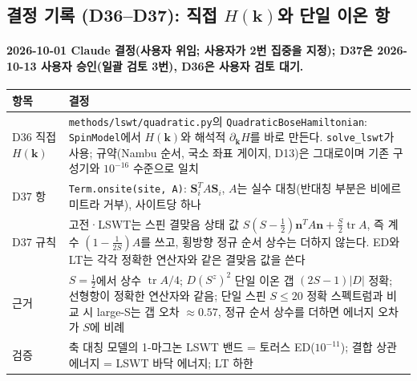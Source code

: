 \subsection{결정 기록 (D36--D37): 직접 $H(\mathbf k)$와 단일 이온 항}\label{decisions-d36-onsite}
\begingroup%
  \framesubtitle{2026-10-01 Claude 결정(사용자 위임; 사용자가 2번 집중을 지정); D37은 2026-10-13 사용자 승인(일괄 검토 3번), D36은 사용자 검토 대기.}
  \small\renewcommand{\arraystretch}{1.12}
  \begin{tabularx}{\textwidth}{@{}P{3.0cm}Y@{}}
    \toprule
    항목 & 결정 \\
    \midrule
    D36 직접 $H(\mathbf k)$ & \texttt{methods/lswt/quadratic.py}의 \texttt{QuadraticBoseHamiltonian}: \texttt{SpinModel}에서 $H(\mathbf k)$와 해석적 $\partial_{\mathbf k}H$를 바로 만든다. \texttt{solve\_lswt}가 사용; 규약(Nambu 순서, 국소 좌표 게이지, D13)은 그대로이며 기존 구성기와 $10^{-16}$ 수준으로 일치 \\
    D37 항 & \texttt{Term.onsite(site, A)}: $\mathbf S_i^{T}A\mathbf S_i$, $A$는 실수 대칭(반대칭 부분은 비에르미트라 거부), 사이트당 하나 \\
    D37 규칙 & 고전·LSWT는 스핀 결맞음 상태 값 $S(S-\tfrac12)\mathbf n^{T}A\mathbf n+\tfrac S2\operatorname{tr}A$, 즉 계수 $(1-\tfrac1{2S})A$를 쓰고, 횡방향 정규 순서 상수는 더하지 않는다. ED와 LT는 각각 정확한 연산자와 같은 결맞음 값을 쓴다 \\
    근거 & $S=\tfrac12$에서 상수 $\operatorname{tr}A/4$; $D(S^z)^2$ 단일 이온 갭 $(2S-1)|D|$ 정확; 선형항이 정확한 연산자와 같음; 단일 스핀 $S\le20$ 정확 스펙트럼과 비교 시 large-S는 갭 오차 $\approx0.57$, 정규 순서 상수를 더하면 에너지 오차가 $S$에 비례 \\
    검증 & 축 대칭 모델의 1-마그논 LSWT 밴드 = 토러스 ED($10^{-11}$); 결합 상관 에너지 = LSWT 바닥 에너지; LT 하한 \\
    \bottomrule
  \end{tabularx}
\endgroup


